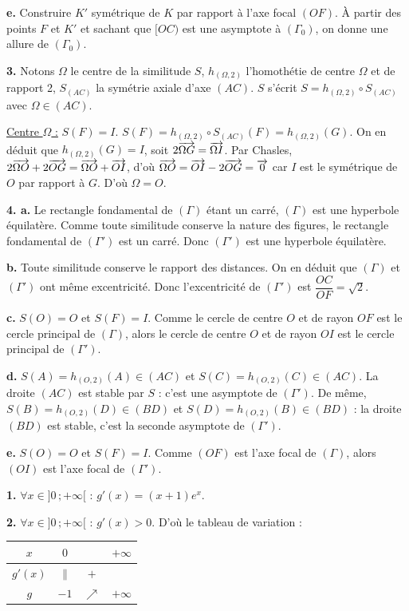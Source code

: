 \documentclass[11pt]{article}
\begin{document}
\textbf{e.} Construire $K'$ symétrique de $K$ par rapport à l'axe focal $(OF)$. À partir des points $F$ et $K'$ et sachant que $[OC)$ est une asymptote à $(\Gamma_0)$, on donne une allure de $(\Gamma_0)$.

\textbf{3.} Notons $\Omega$ le centre de la similitude $S$, $h_{(\Omega,2)}$ l'homothétie de centre $\Omega$ et de rapport 2, $S_{(AC)}$ la symétrie axiale d'axe $(AC)$. $S$ s'écrit $S = h_{(\Omega,2)} \circ S_{(AC)}$ avec $\Omega \in (AC)$.

\underline{Centre $\Omega$ :} $S(F) = I$. $S(F) = h_{(\Omega,2)} \circ S_{(AC)}(F) = h_{(\Omega,2)}(G)$. On en déduit que $h_{(\Omega,2)}(G) = I$, soit $2\overrightarrow{\Omega G} = \overrightarrow{\Omega I}$. Par Chasles, $2\overrightarrow{\Omega O} + 2\overrightarrow{OG} = \overrightarrow{\Omega O} + \overrightarrow{OI}$, d'où $\overrightarrow{\Omega O} = \overrightarrow{OI} - 2\overrightarrow{OG} = \overrightarrow{0}$ car $I$ est le symétrique de $O$ par rapport à $G$. D'où $\Omega = O$.

\textbf{4. a.} Le rectangle fondamental de $(\Gamma)$ étant un carré, $(\Gamma)$ est une hyperbole équilatère. Comme toute similitude conserve la nature des figures, le rectangle fondamental de $(\Gamma')$ est un carré. Donc $(\Gamma')$ est une hyperbole équilatère.

\textbf{b.} Toute similitude conserve le rapport des distances. On en déduit que $(\Gamma)$ et $(\Gamma')$ ont même excentricité. Donc l'excentricité de $(\Gamma')$ est $\dfrac{OC}{OF} = \sqrt{2}$.

\textbf{c.} $S(O) = O$ et $S(F) = I$. Comme le cercle de centre $O$ et de rayon $OF$ est le cercle principal de $(\Gamma)$, alors le cercle de centre $O$ et de rayon $OI$ est le cercle principal de $(\Gamma')$.

\textbf{d.} $S(A) = h_{(O,2)}(A) \in (AC)$ et $S(C) = h_{(O,2)}(C) \in (AC)$. La droite $(AC)$ est stable par $S$ : c'est une asymptote de $(\Gamma')$. De même, $S(B) = h_{(O,2)}(D) \in (BD)$ et $S(D) = h_{(O,2)}(B) \in (BD)$ : la droite $(BD)$ est stable, c'est la seconde asymptote de $(\Gamma')$.

\textbf{e.} $S(O) = O$ et $S(F) = I$. Comme $(OF)$ est l'axe focal de $(\Gamma)$, alors $(OI)$ est l'axe focal de $(\Gamma')$.


\textbf{1.} $\forall x \in ]0\,;+\infty[$ : $g'(x) = (x + 1)e^x$.

\textbf{2.} $\forall x \in ]0\,;+\infty[$ : $g'(x) > 0$. D'où le tableau de variation :
\begin{center}\renewcommand{\arraystretch}{1.4}
\begin{tabular}{|c|ccc|}
\hline
$x$ & $0$ & & $+\infty$ \\
\hline
$g'(x)$ & $\|$ & $+$ & \\
\hline
$g$ & $-1$ & $\nearrow$ & $+\infty$ \\
\hline
\end{tabular}
\end{center}
\end{document}

